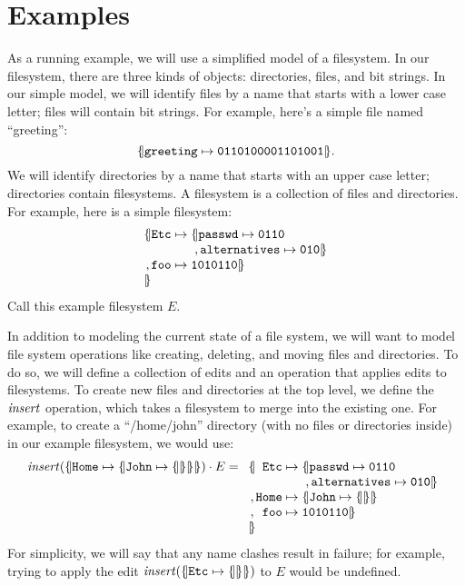 \section{Examples}
\label{sec:tree-examples}

As a running example, we will use a simplified model of a filesystem. In our
filesystem, there are three kinds of objects: directories, files, and
bit strings. In our simple model, we will identify files by a name that
starts with a lower case letter; files will contain bit strings. For
example, here's a simple file named ``greeting'':
\[\{\hspace{-2pt}|\mathtt{greeting}\mapsto\mathtt{0110100001101001}|\hspace{-2pt}\}.\]
We will identify directories by a name that starts with an upper case letter;
directories contain filesystems. A filesystem is a collection of files and
directories. For example, here is a simple filesystem:
\[
\begin{array}{c@{}r@{\;}l@{\;}l}
    \Open&\Label{Etc} &\To&\Open\Label{passwd}\To\Label{0110} \\
         &            &   &\;,  \Label{alternatives}\To\Label{010}\Close \\
    ,    &\Label{foo} &\To&\Label{1010110}\Close \\
    \Close
\end{array}
\]
Call this example filesystem $E$.

In addition to modeling the current state of a file system, we will want to
model file system operations like creating, deleting, and moving files and
directories. To do so, we will define a collection of edits and an operation
that applies edits to filesystems. To create new files and directories at
the top level, we define the $\mathit{insert}$ operation, which takes a filesystem
to merge into the existing one. For example, to create a ``/home/john'' directory (with no files
or directories inside) in our example filesystem, we would use:
\[\Insert(\Open\Label{Home}\To\Open\Label{John}\To\Open\Close\Close\Close)\cdot E=
\begin{array}[t]{c@{}r@{\;}l@{\;}l}
    \Open&\Label{Etc} &\To&\Open\Label{passwd}\To\Label{0110} \\
         &            &   &\;,  \Label{alternatives}\To\Label{010}\Close \\
    ,    &\Label{Home}&\To&\Open\Label{John}\To\Open\Close\Close \\
    ,    &\Label{foo} &\To&\Label{1010110}\Close \\
    \Close
\end{array}
\]
For simplicity, we will say that any name clashes result in failure; for
example, trying to apply the edit $\mathit{insert}(\{\hspace{-2pt}|\mathtt{Etc}\mapsto\{\hspace{-2pt}||\hspace{-2pt}\}|\hspace{-2pt}\})$ to $E$
would be undefined.

